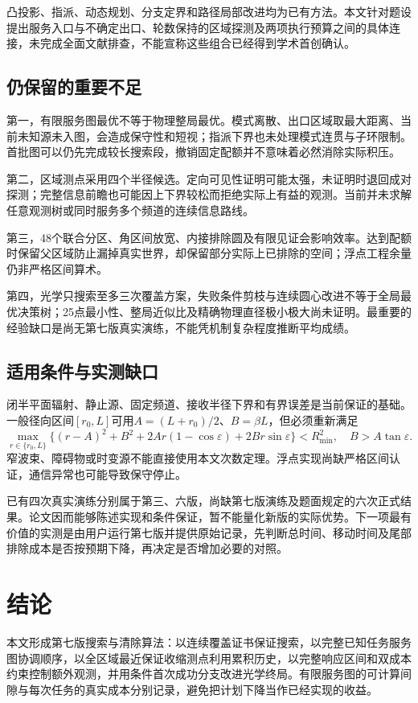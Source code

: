 \documentclass[UTF8,a4paper,zihao=-4,fontset=windows]{ctexart}
\begin{document}
凸投影、指派、动态规划、分支定界和路径局部改进均为已有方法。本文针对题设提出服务入口与不确定出口、轮数保持的区域探测及两项执行预算之间的具体连接，未完成全面文献排查，不能宣称这些组合已经得到学术首创确认。

\subsection{仍保留的重要不足}
第一，有限服务图最优不等于物理整局最优。模式离散、出口区域取最大距离、当前未知源未入图，会造成保守性和短视；指派下界也未处理模式连贯与子环限制。首批图可以仍先完成较长搜索段，撤销固定配额并不意味着必然消除实际积压。

第二，区域测点采用四个半径候选。定向可见性证明可能太强，未证明时退回成对探测；完整信息前瞻也可能因上下界较松而拒绝实际上有益的观测。当前并未求解任意观测树或同时服务多个频道的连续信息路线。

第三，48个联合分区、角区间放宽、内接排除圆及有限见证会影响效率。达到配额时保留父区域防止漏掉真实世界，却保留部分实际上已排除的空间；浮点工程余量仍非严格区间算术。

第四，光学只搜索至多三次覆盖方案，失败条件剪枝与连续圆心改进不等于全局最优决策树；25点最小性、整局近似比及精确物理直径极小极大尚未证明。最重要的经验缺口是尚无第七版真实演练，不能凭机制复杂程度推断平均成绩。

\subsection{适用条件与实测缺口}
闭半平面辐射、静止源、固定频道、接收半径下界和有界误差是当前保证的基础。一般径向区间$[r_0,L]$可用$A=(L+r_0)/2$、$B=\beta L$，但必须重新满足
\begin{equation}
\max_{r\in\{r_0,L\}}\{(r-A)^2+B^2+2Ar(1-\cos\varepsilon)
+2Br\sin\varepsilon\}<R_{\min}^2,\quad B>A\tan\varepsilon.
\end{equation}
窄波束、障碍物或时变源不能直接使用本文次数定理。浮点实现尚缺严格区间认证，通信异常也可能导致保守停止。

已有四次真实演练分别属于第三、六版，尚缺第七版演练及题面规定的六次正式结果。论文因而能够陈述实现和条件保证，暂不能量化新版的实际优势。下一项最有价值的实测是由用户运行第七版并提供原始记录，先判断总时间、移动时间及尾部排除成本是否按预期下降，再决定是否增加必要的对照。


\section{结论}
本文形成第七版搜索与清除算法：以连续覆盖证书保证搜索，以完整已知任务服务图协调顺序，以全区域最近保证收缩测点利用累积历史，以完整响应区间和双成本约束控制额外观测，并用条件首次成功分支改进光学终局。有限服务图的可计算间隙与每次任务的真实成本分别记录，避免把计划下降当作已经实现的收益。
\end{document}
